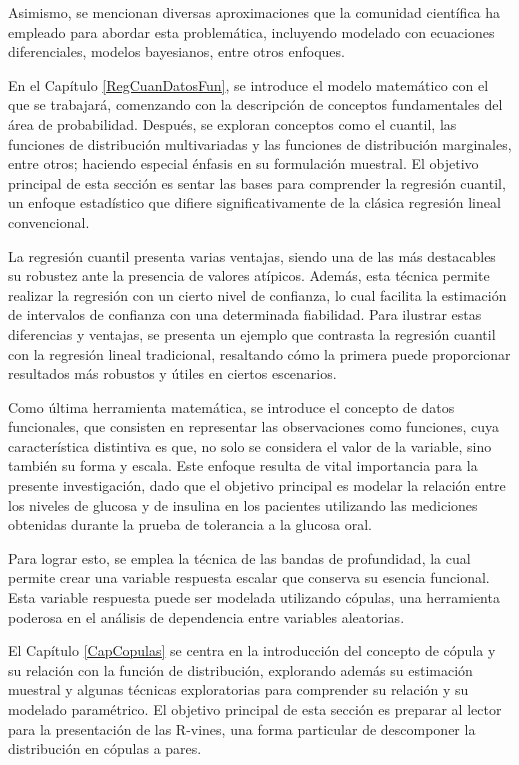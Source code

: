 Asimismo, se mencionan diversas aproximaciones que la comunidad científica ha empleado para abordar esta problemática, incluyendo modelado con ecuaciones diferenciales, modelos bayesianos, entre otros enfoques.

En el Capítulo \ref{RegCuanDatosFun}, se introduce el modelo matemático con el que se trabajará, comenzando con la descripción de conceptos fundamentales del área de probabilidad. Después, se exploran conceptos como el cuantil, las funciones de distribución multivariadas y las funciones de distribución marginales, entre otros; haciendo especial énfasis en su formulación muestral. El objetivo principal de esta sección es sentar las bases para comprender la regresión cuantil, un enfoque estadístico que difiere significativamente de la clásica regresión lineal convencional.

La regresión cuantil presenta varias ventajas, siendo una de las más destacables su robustez ante la presencia de valores atípicos. Además, esta técnica permite realizar la regresión con un cierto nivel de confianza, lo cual facilita la estimación de intervalos de confianza con una determinada fiabilidad. Para ilustrar estas diferencias y ventajas, se presenta un ejemplo que contrasta la regresión cuantil con la regresión lineal tradicional, resaltando cómo la primera puede proporcionar resultados más robustos y útiles en ciertos escenarios.

Como última herramienta matemática, se introduce el concepto de datos funcionales, que consisten en representar las observaciones como funciones, cuya característica distintiva es que, no solo se considera el valor de la variable, sino también su forma y escala. Este enfoque resulta de vital importancia para la presente investigación, dado que el objetivo principal es modelar la relación entre los niveles de glucosa y de insulina en los pacientes utilizando las mediciones obtenidas durante la prueba de tolerancia a la glucosa oral.

Para lograr esto, se emplea la técnica de las bandas de profundidad, la cual permite crear una variable respuesta escalar que conserva su esencia funcional. Esta variable respuesta puede ser modelada utilizando cópulas, una herramienta poderosa en el análisis de dependencia entre variables aleatorias. 

El Capítulo \ref{CapCopulas} se centra en la introducción del concepto de cópula y su relación con la función de distribución, explorando además su estimación muestral y algunas técnicas exploratorias para comprender su relación y su modelado paramétrico. El objetivo principal de esta sección es preparar al lector para la presentación de las R-vines, una forma particular de descomponer la distribución en cópulas a pares.

